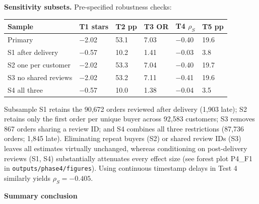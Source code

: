 \documentclass[10pt,a4paper,twocolumn]{article}
\newcommand{\minihead}[1]{\par\needspace{8\baselineskip}\smallskip\textbf{#1}\par}
\newcommand{\code}[1]{\texttt{#1}}
\begin{document}
\textbf{Sensitivity subsets.} Pre-specified robustness checks:
{\footnotesize
\begin{tabularx}{\linewidth}{@{}L{1.75cm} Y Y Y Y Y@{}}
\toprule
\textbf{Sample} & \textbf{T1 stars} & \textbf{T2 pp} & \textbf{T3 OR} & \textbf{T4 $\rho_S$} & \textbf{T5 pp} \\
\midrule
Primary & $-$2.02 & 53.1 & 7.03 & $-$0.40 & 19.6 \\
S1 after delivery & $-$0.57 & 10.2 & 1.41 & $-$0.03 & 3.8 \\
S2 one per customer & $-$2.02 & 53.3 & 7.04 & $-$0.40 & 19.7 \\
S3 no shared reviews & $-$2.02 & 53.2 & 7.11 & $-$0.41 & 19.6 \\
S4 all three & $-$0.57 & 10.0 & 1.38 & $-$0.04 & 3.5 \\
\bottomrule
\end{tabularx}}

Subsample S1 retains the 90,672 orders reviewed after delivery (1,903 late); S2 retains only the first order per unique
buyer across 92,583 customers; S3 removes 867 orders sharing a review ID; and S4 combines all three restrictions
(87,736 orders; 1,845 late). Eliminating repeat buyers (S2) or shared review IDs (S3) leaves all estimates virtually
unchanged, whereas conditioning on post-delivery reviews (S1, S4) substantially attenuates every effect size (see
forest plot P4\_F1 in \code{outputs/phase4/figures}). Using continuous timestamp delays in Test 4 similarly yields $\rho_S=-0.405$.

\minihead{Summary conclusion}
\noindent{}

\end{document}

